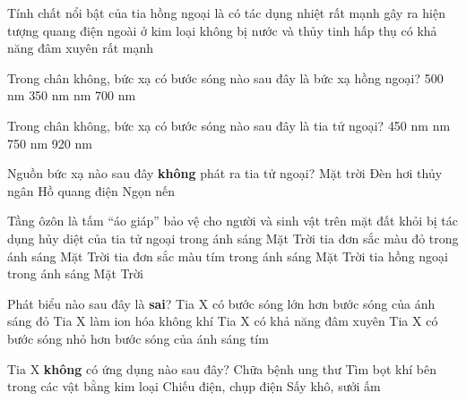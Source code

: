 \begin{ex}%
 Tính chất nổi bật của tia hồng ngoại là
\choice
{\True có tác dụng nhiệt rất mạnh}
{gây ra hiện tượng quang điện ngoài ở kim loại}
{không bị nước và thủy tinh hấp thụ}
{có khả năng đâm xuyên rất mạnh}
\end{ex} 
\begin{ex} 
 Trong chân không, bức xạ có bước sóng nào sau đây là bức xạ hồng ngoại?
\choice
{500 nm}
{350 nm}
{ nm}
{700 nm}
\end{ex} 
\begin{ex} 
 Trong chân không, bức xạ có bước sóng nào sau đây là tia tử ngoại?
\choice
{450 nm}
{ nm}
{750 nm}
{920 nm}
\end{ex} 
\begin{ex}%
Nguồn bức xạ nào sau đây \textbf{không} phát ra tia tử ngoại?
\choice
{Mặt trời}
{Đèn hơi thủy ngân}
{Hồ quang điện}
{\True Ngọn nến}
\loigiai{
}
\end{ex} 
\begin{ex}%
 Tầng ôzôn là tấm “áo giáp” bảo vệ cho người và sinh vật trên mặt đất khỏi bị tác dụng hủy diệt của
\choice
{\True tia tử ngoại trong ánh sáng Mặt Trời}
{tia đơn sắc màu đỏ trong ánh sáng Mặt Trời}
{tia đơn sắc màu tím trong ánh sáng Mặt Trời}
{tia hồng ngoại trong ánh sáng Mặt Trời}
\end{ex} 
\begin{ex} %
 Phát biểu nào sau đây là \textbf{sai}?
\choice
{\True Tia X có bước sóng lớn hơn bước sóng của ánh sáng đỏ}
{Tia X làm ion hóa không khí}
{Tia X có khả năng đâm xuyên}
{Tia X có bước sóng nhỏ hơn bước sóng của ánh sáng tím}
\end{ex} 
\begin{ex}%
 Tia X \textbf{không} có ứng dụng nào sau đây?
\choice
{Chữa bệnh ung thư}
{Tìm bọt khí bên trong các vật bằng kim loại}
{Chiếu điện, chụp điện}
{\True Sấy khô, sưởi ấm}
\end{ex} 
